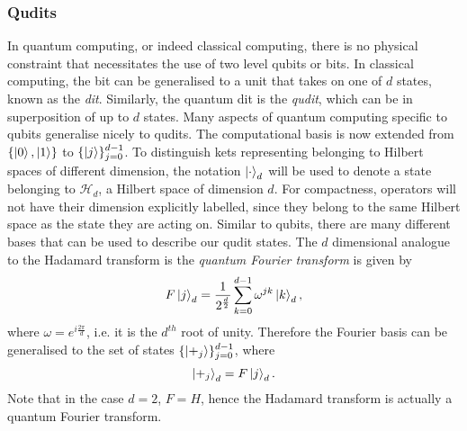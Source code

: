 \subsubsection{Qudits}
\label{subsubsection:qudits}
In quantum computing, or indeed classical computing, there is no physical constraint that necessitates the use of two level qubits or bits.
In classical computing, the bit can be generalised to a unit that takes on one of $d$ states, known as the \emph{dit}.
Similarly, the quantum dit is the \emph{qudit}, which can be in superposition of up to $d$ states.
Many aspects of quantum computing specific to qubits generalise nicely to qudits.
The computational basis is now extended from $\{\ket{0}, \ket{1}\}$ to $\{\ket{j}\}_{j=0}^{d-1}$.
To distinguish kets representing belonging to Hilbert spaces of different dimension, the notation $\ket{\cdot}_d$ will be used to denote a state belonging to $\mathcal{H}_d$, a Hilbert space of dimension $d$.
For compactness, operators will not have their dimension explicitly labelled, since they belong to the same Hilbert space as the state they are acting on.
Similar to qubits, there are many different bases that can be used to describe our qudit states.
The $d$ dimensional analogue to the Hadamard transform is the \emph{quantum Fourier transform} is given by
\begin{equation}
    F\ket{j}_d = \frac{1}{2^{\frac{d}{2}}} \sum_{k=0}^{d-1} \omega^{jk}\ket{k}_d,
\end{equation}
where $\omega = e^{i\frac{2\pi}{d}}$, i.e. it is the $d^{th}$ root of unity.
Therefore the Fourier basis can be generalised to the set of states  $\{\ket{+_j}\}_{j=0}^{d-1}$, where
\begin{equation}
    \ket{+_j}_d = F\ket{j}_d.
\end{equation}
Note that in the case $d=2$, $F = H$, hence the Hadamard transform is actually a quantum Fourier transform.

